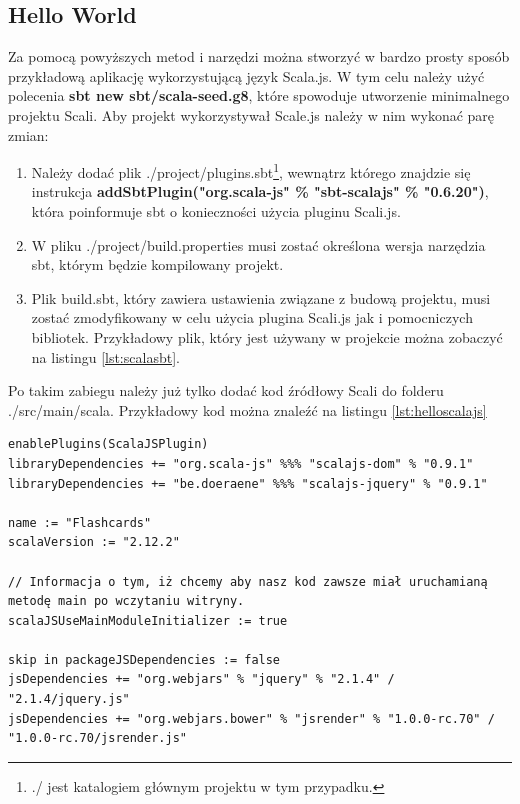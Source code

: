 \newpage

\subsection{Hello World}

Za pomocą powyższych metod i narzędzi można stworzyć w bardzo prosty sposób przykładową aplikację wykorzystującą język Scala.js. W tym celu należy użyć polecenia \textbf{sbt new sbt/scala-seed.g8}, które spowoduje utworzenie minimalnego projektu Scali. Aby projekt wykorzystywał Scale.js należy w nim wykonać parę zmian:


\begin{enumerate}
	\item Należy dodać plik ./project/plugins.sbt\footnote{./ jest katalogiem głównym projektu w tym przypadku.}, wewnątrz którego znajdzie się instrukcja \textbf{addSbtPlugin("org.scala-js" \% "sbt-scalajs" \% "0.6.20")}, która poinformuje sbt o konieczności użycia pluginu Scali.js.
	\item W pliku ./project/build.properties musi zostać określona wersja narzędzia sbt, którym będzie kompilowany projekt.
	\item Plik build.sbt, który zawiera ustawienia związane z budową projektu, musi zostać zmodyfikowany w celu użycia plugina Scali.js jak i pomocniczych bibliotek. Przykładowy plik, który jest używany w projekcie można zobaczyć na listingu \ref{lst:scalasbt}.
\end{enumerate}

Po takim zabiegu należy już tylko dodać kod źródłowy Scali do folderu ./src/main/scala. Przykładowy kod można znaleźć na listingu \ref{lst:helloscalajs}

\begin{minipage}{\linewidth}
\begin{lstlisting}[label={lst:scalasbt},
frame=single, numbers=none,captionpos=b, 
caption={Plik .sbt, który jest wykorzystywany w projekcie.}]
enablePlugins(ScalaJSPlugin)
libraryDependencies += "org.scala-js" %%% "scalajs-dom" % "0.9.1"
libraryDependencies += "be.doeraene" %%% "scalajs-jquery" % "0.9.1"

name := "Flashcards"
scalaVersion := "2.12.2"

// Informacja o tym, iż chcemy aby nasz kod zawsze miał uruchamianą metodę main po wczytaniu witryny.
scalaJSUseMainModuleInitializer := true

skip in packageJSDependencies := false
jsDependencies += "org.webjars" % "jquery" % "2.1.4" / "2.1.4/jquery.js" 
jsDependencies += "org.webjars.bower" % "jsrender" % "1.0.0-rc.70" / "1.0.0-rc.70/jsrender.js"
\end{lstlisting}
\end{minipage}


